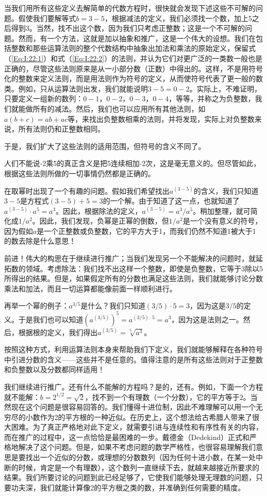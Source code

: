 当我们用所有这些定义去解简单的代数方程时，很快就会发现下述这些不可解的问题。假使我们要解等式$b=3-5$，根据减法的定义，我们必须找一个数，加上5之后得到3。当然，找不出这个数，因为我们只考虑正整数；这是一个不可解的问题。然而，有一个方法，这就是加以抽象和推广，这是一个伟大的设想。我们在包括整数和那些运算法则的整个代数结构中抽象出加法和乘法的原始定义，保留式（\ref{Eq:I:22:1}）和式（\ref{Eq:I:22:2}）的法则，并认为它们对更广泛的一类数一般也是正确的，尽管这些法则原来是从一小部分数（正数）中得出的。这样，不是用符号化的整数来定义法则，而是用法则作为符号的定义，从而使符号代表了更一般的数类。例如，只从运算法则出发，我们就能说明$3-5=0-2$。实际上，不难证明，只要定义一组新的数列：$0-1$，$0-2$，$0-3$，$0-4$，等等，并称之为负整数，我们就能做所有的减法。然后，我们也可以应用所有其他法则，如$a(b+c)=ab+ac$等，来找出负整数相乘的法则，并将发现，实际上对负整数来说，所有法则仍和正整数相同。

于是，我们扩大了这些法则的适用范围，但符号的含义不同了。

人们不能说-2乘5的真正含义是把5连续相加-2次，这是毫无意义的。但尽管如此，根据这些法则所做的一切事情仍然都是正确的。

在取幂时出现了一个有趣的问题。假如我们希望找出$a^{(3-5)}$的含义，我们只知道$3-5$是方程式$(3-5)+5=3$的一个解。由于知道了这一点，也就知道了$a^{(3-5)} \cdot a^5=a^3$。因此，根据除法的定义，$a^{(3-5)}=a^3/a^5$。稍加整理，就可简化成$1/a^2$。因此，我们发现，负幂是正幂的倒数，但$1/a^2$是一个没有意义的符号，因为假如$a$是一个正整数或负整数，它的平方大于1，而我们仍然不知道1被大于1的数去除是什么意思！

前进！伟大的构思在于继续进行推广；当我们发现另一个不能解决的问题时，就延拓数的领域。考虑除法：我们找不出这样一个整数，即使是负整数，它等于3除以5所得出的结果。但是，如果假定所有的分数也满足这些法则，我们就能够讨论分数乘法和加法，而且一切运算都能像前面一样顺利进行。

再举一个幂的例子：$a^{3/5}$是什么？我们只知道$(3/5) \cdot 5=3$，因为这是$3/5$的定义。于是我们也可以知道$(a^{(3/5)})^5=a^{(3/5) \cdot 5}=a^3$，因为这是法则之一。然后，根据根的定义，我们得出$a^{(3/5)}=\sqrt[5]{a^3}$。

按照这种方式，利用运算法则本身来帮助我们下定义，我们就能够解释在各种符号中引进分数的含义——这些并不是任意的。值得注意的是所有这些法则对于正整数和负整数以及分数都同样适用！

我们继续进行推广。还有什么不能解的方程吗？是的，还有。例如，下面一个方程就不能解：$b=2^{1/2}=\sqrt{2}$，找不到一个有理数（一个分数），它的平方等于$2$。当然现在这个问题是很容易回答的。我们懂得十进位制，因此不难理解可以用一个无穷尽的小数作为2的平方根的一种近似。在历史上，这个想法给古希腊人带来了很大困难。为了真正严格地对此下定义，就需要引进与连续性和有序性有关的内容，而在推广的过程中，这一点恰恰是最困难的一步。戴德金（Dedekind）正式和严格地解决了这个问题。但是，如果不考虑问题的数学严格性，也很容易理解我们意思是要找出一个近似的分数，或理想的分数数列（因为任何十进小数，在某一处中断的时候，肯定是一个有理数），这个数列一直继续下去，就越来越接近所要求的结果。我们所要讨论的问题到此已经足够了，它使我们能够处理无理数的问题，只要功夫深，我们就能计算像2的平方根之类的数，并准确到任何需要的精度。


